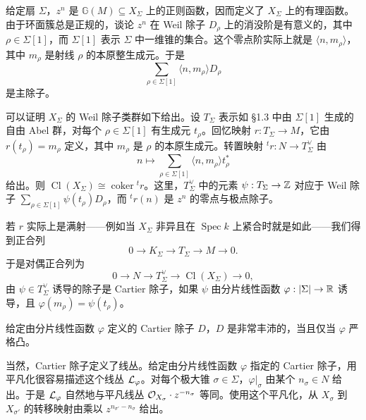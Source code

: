 
给定扇 $\Sigma$，$z^n$ 是 $\mathbb{G}(M)\subseteq X_\Sigma$ 上的正则函数，因而定义了 $X_\Sigma$ 上的有理函数。由于环面簇总是正规的，谈论 $z^n$ 在 Weil 除子 $D_\rho$ 上的消没阶是有意义的，其中 $\rho\in\Sigma[1]$，而 $\Sigma[1]$ 表示 $\Sigma$ 中一维锥的集合。这个零点阶实际上就是 $\langle n,m_\rho\rangle$，其中 $m_\rho$ 是射线 $\rho$ 的本原整生成元。于是
\[
  \sum_{\rho\in\Sigma[1]}\langle n,m_\rho\rangle D_\rho
\]
是主除子。

可以证明 $X_\Sigma$ 的 Weil 除子类群如下给出。设 $T_\Sigma$ 表示如 §1.3 中由 $\Sigma[1]$ 生成的自由 Abel 群，对每个 $\rho\in\Sigma[1]$ 有生成元 $t_\rho$。回忆映射 $r:T_\Sigma\to M$，它由 $r(t_\rho)=m_\rho$ 定义，其中 $m_\rho$ 是 $\rho$ 的本原生成元。转置映射 ${}^tr:N\to T_\Sigma^{\vee}$ 由
\[
  n\mapsto\sum_{\rho\in\Sigma[1]}\langle n,m_\rho\rangle t_\rho^{*}
\]
给出。则 $\operatorname{Cl}(X_\Sigma)\cong\operatorname{coker}{}^tr$。这里，$T_\Sigma^{\vee}$ 中的元素 $\psi:T_\Sigma\to\mathbb{Z}$ 对应于 Weil 除子 $\sum_{\rho\in\Sigma[1]}\psi(t_\rho)D_\rho$，而 ${}^tr(n)$ 是 $z^n$ 的零点与极点除子。

若 $r$ 实际上是满射——例如当 $X_\Sigma$ 非异且在 $\operatorname{Spec} k$ 上紧合时就是如此——我们得到正合列
\begin{equation}
  0\to K_\Sigma\to T_\Sigma\to M\to 0. \tag{3.1}
\end{equation}
于是对偶正合列为
\begin{equation}
  0\to N\to T_\Sigma^{\vee}\to\operatorname{Cl}(X_\Sigma)\to 0, \tag{3.2}
\end{equation}
由 $\psi\in T_\Sigma^{\vee}$ 诱导的除子是 Cartier 除子，如果 $\psi$ 由分片线性函数 $\varphi:|\Sigma|\to\mathbb{R}$ 诱导，且 $\varphi(m_\rho)=\psi(t_\rho)$。

给定由分片线性函数 $\varphi$ 定义的 Cartier 除子 $D$，$D$ 是非常丰沛的，当且仅当 $\varphi$ 严格凸。

当然，Cartier 除子定义了线丛。给定由分片线性函数 $\varphi$ 指定的 Cartier 除子，用平凡化很容易描述这个线丛 $\mathcal{L}_\varphi$。对每个极大锥 $\sigma\in\Sigma$，$\varphi|_\sigma$ 由某个 $n_\sigma\in N$ 给出。于是 $\mathcal{L}_\varphi$ 自然地与平凡线丛 $\mathcal{O}_{X_\sigma}\cdot z^{-n_\sigma}$ 等同。使用这个平凡化，从 $X_\sigma$ 到 $X_{\sigma'}$ 的转移映射由乘以 $z^{n_{\sigma'}-n_\sigma}$ 给出。

